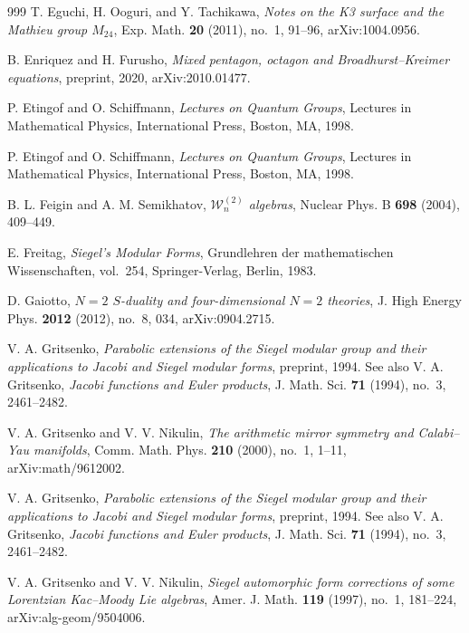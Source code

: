 \begin{thebibliography}{999}
T. Eguchi, H. Ooguri, and Y. Tachikawa, \emph{Notes on the K3 surface and the Mathieu group $M_{24}$}, Exp. Math. \textbf{20} (2011), no.~1, 91--96, arXiv:1004.0956.

B. Enriquez and H. Furusho, \emph{Mixed pentagon, octagon and Broadhurst--Kreimer equations}, preprint, 2020, arXiv:2010.01477.

P. Etingof and O. Schiffmann, \emph{Lectures on Quantum Groups}, Lectures in Mathematical Physics, International Press, Boston, MA, 1998.

P. Etingof and O. Schiffmann, \emph{Lectures on Quantum Groups}, Lectures in Mathematical Physics, International Press, Boston, MA, 1998.

B. L. Feigin and A. M. Semikhatov, \emph{$\mathcal W_n^{(2)}$ algebras}, Nuclear Phys. B \textbf{698} (2004), 409--449.

E. Freitag, \emph{Siegel's Modular Forms}, Grundlehren der mathematischen Wissenschaften, vol.~254, Springer-Verlag, Berlin, 1983.

D. Gaiotto, \emph{$N=2$ $S$-duality and four-dimensional $N=2$ theories}, J. High Energy Phys. \textbf{2012} (2012), no.~8, 034, arXiv:0904.2715.

V. A. Gritsenko, \emph{Parabolic extensions of the Siegel modular group and their applications to Jacobi and Siegel modular forms}, preprint, 1994. See also V. A. Gritsenko, \emph{Jacobi functions and Euler products}, J. Math. Sci. \textbf{71} (1994), no.~3, 2461--2482.

V. A. Gritsenko and V. V. Nikulin, \emph{The arithmetic mirror symmetry and Calabi--Yau manifolds}, Comm. Math. Phys. \textbf{210} (2000), no.~1, 1--11, arXiv:math/9612002.

V. A. Gritsenko, \emph{Parabolic extensions of the Siegel modular group and their applications to Jacobi and Siegel modular forms}, preprint, 1994. See also V. A. Gritsenko, \emph{Jacobi functions and Euler products}, J. Math. Sci. \textbf{71} (1994), no.~3, 2461--2482.

V. A. Gritsenko and V. V. Nikulin, \emph{Siegel automorphic form corrections of some Lorentzian Kac--Moody Lie algebras}, Amer. J. Math. \textbf{119} (1997), no.~1, 181--224, arXiv:alg-geom/9504006.


\end{thebibliography}
